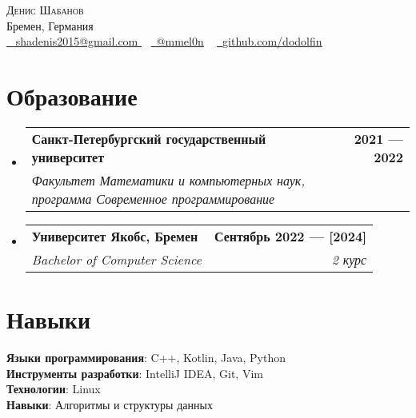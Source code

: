 \documentclass[a4,12pt]{article}
\makeatletter
\newcommand{\resumeSubheading}[4]{
  \vspace{-2pt}\item
    \begin{tabular*}{1.0\textwidth}[t]{l@{\extracolsep{\fill}}r}
      \textbf{#1} & \textbf{\small #2} \\
      \textit{\small#3} & \textit{\small #4} \\
    \end{tabular*}\vspace{-7pt}
}
\newcommand{\resumeSubHeadingListStart}{\begin{itemize}[leftmargin=0.0in, label={}]}
\newcommand{\resumeSubHeadingListEnd}{\end{itemize}}
\makeatother
\begin{document}

\begin{center}
    {\Huge \scshape Денис Шабанов} \\ \vspace{1pt}
    Бремен, Германия \\ \vspace{1pt}
    \href{
    mailto:shadenis2015@gmail.com
    }{\raisebox{-0.2\height}\faEnvelope\  \underline{
    shadenis2015@gmail.com
    }} ~ 
    \href{https://t.me/mmel0n}{\raisebox{-0.2\height}\faSend\ \underline{@mmel0n}}  ~
    \href{https://github.com/dodolfin}{\raisebox{-0.2\height}\faGithub\ \underline{github.com/dodolfin}}
    \vspace{-8pt}
\end{center}

\section{Образование}
  \resumeSubHeadingListStart
    \resumeSubheading
      {Санкт-Петербургский государственный университет}{2021 — 2022}
      {Факультет Математики и компьютерных наук, программа Современное программирование}{}
    \resumeSubheading
      {Университет Якобс, Бремен}{Сентябрь 2022 — [2024]}
      {Bachelor of Computer Science}{2 курс}
  \resumeSubHeadingListEnd
  
\section{Навыки}
 \begin{itemize}[leftmargin=0.15in, label={}]
    \small{\item{
     \textbf{Языки программирования}{: C++, Kotlin, Java, Python} \\
     \textbf{Инструменты разработки}{: IntelliJ IDEA, Git, Vim } \\
     \textbf{Технологии}{: Linux} \\
     \textbf{Навыки}{: Алгоритмы и структуры данных}
    }}
 \end{itemize}
 \vspace{-16pt}
\end{document}
